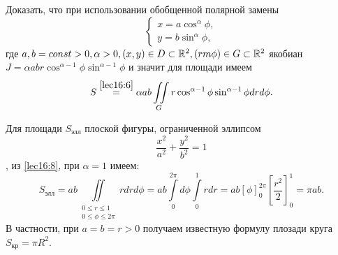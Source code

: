 \documentclass[../../main.tex]{subfiles}
\begin{document}
\begin{exercise}
	Доказать, что при использовании обобщенной полярной замены
	\begin{equation*}
	\begin{cases}
	x=a\cos^\alpha\phi,\\
	y=b\sin^\alpha\phi,
	\end{cases}
	\end{equation*}
	где $
	a,b=const>0,
	\alpha>0, (x,y)\in D \subset \mathbb{R}^2, (rm\phi)\in G\subset \mathbb{R}^2$
	якобиан $J=\alpha a b r \cos^{\alpha-1}\phi\sin^{\alpha-1}\phi$ и значит для площади имеем
	\begin{equation}
	\label{lec16:8}
	S \overset{\ref{lec16:6}}{=} \alpha a b \iint\limits_G r\cos^{\alpha - 1}\phi
	\sin^{\alpha - 1}\phi dr d\phi.
	\end{equation}
\end{exercise}
	\begin{example}
	Для площади $S_{\text{элл}}$ плоской фигуры, ограниченной эллипсом
	\[
	\dfrac{x^2}{a^2} + \dfrac{y^2}{b^2} = 1
	\], 
	из \eqref{lec16:8}, при
	$ \alpha = 1 $ имеем:
	\begin{equation*}
	S_{\text{элл}} = 
	ab\iint\limits_
	{\begin{gathered}
		0\leq r\leq1\\
		0\leq \phi \leq 2\pi
		\end{gathered}
	 } rdrd \phi =
	ab \int\limits_0^{2\pi}d\phi\int\limits_0^1rdr =
	ab \left[\phi \right]^{2\pi}_0
	\left[\dfrac{r^2}{2}\right]_0^1 = \pi ab.
	\end{equation*}
	В частности, при $a = b = r > 0$ получаем известную формулу плозади круга $S_{\text{кр}} = \pi R^2$.
\end{example}
\end{document}
